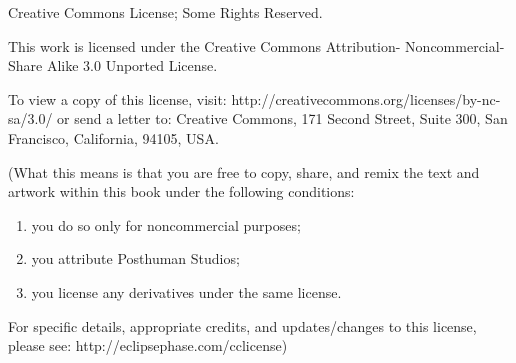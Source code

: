 Creative Commons License; Some Rights Reserved.

This work is licensed under the Creative Commons Attribution-
Noncommercial-Share Alike 3.0 Unported License.

To view a copy of this license, visit:
http://creativecommons.org/licenses/by-nc-sa/3.0/ or send a letter to:
Creative Commons, 171 Second Street, Suite 300, San Francisco,
California, 94105, USA.

(What this means is that you are free to copy, share, and remix the
text and artwork within this book under the following conditions:

\begin{enumerate}
\item you do so only for noncommercial purposes;
\item you attribute Posthuman Studios;
\item you license any derivatives under the same license. 
\end{enumerate}

For specific details, appropriate credits, and updates/changes to this
license, please see: http://eclipsephase.com/cclicense)

